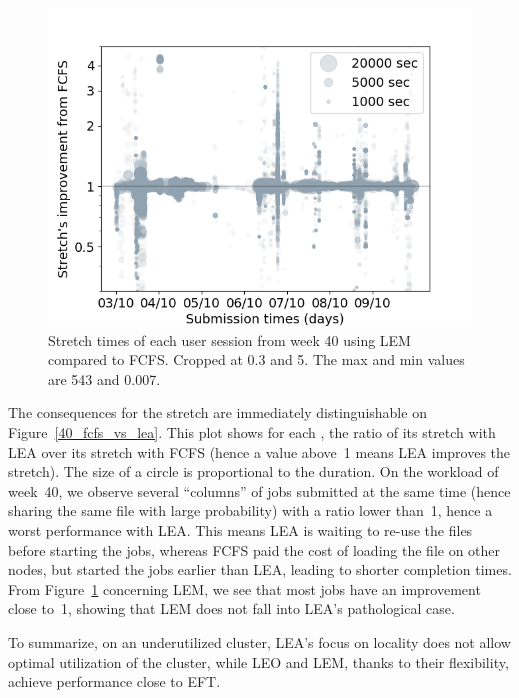 \documentclass[sigconf,review,anonymous]{acmart}
\newcommand{\rev}[1]{{\color{blue}{#1}}}
\newcommand{\us}{\ensuremath{\mathit{user~session}}\xspace}
\begin{document}
\begin{figure}[t]\centering\includegraphics[width=0.9\linewidth]{../MBSS/plot/Stretch_times/Stretch_times_FCFS_LEM_2022-10-03->2022-10-09_V10000_anonymous_450_128_32_256_4_1024.png}\caption{Stretch times of each user session from week 40 using LEM compared to FCFS. Cropped at 0.3 and 5. The max and min values are 543 and 0.007.}\label{40_fcfs_vs_lem}\end{figure}
The consequences for the stretch are immediately distinguishable on Figure~\ref{40_fcfs_vs_lea}.
This plot shows for each \rev{\us}, the ratio of its stretch with LEA over its stretch with FCFS (hence a value above~1 means LEA improves the stretch).
The size of a circle is proportional to the \rev{\us's} duration.
On the workload of week~40, we observe several ``columns'' of jobs submitted at the same time (hence sharing the same file with large probability)
with a ratio lower than~1, hence a worst performance with LEA.
This means LEA is waiting to re-use the files before starting the jobs,
whereas FCFS paid the cost of loading the file on other nodes, but started the jobs
earlier than LEA, leading to shorter completion times.
From Figure~\ref{40_fcfs_vs_lem} concerning LEM, we see that most jobs have an improvement close to~1, showing 
that LEM does not fall into LEA's pathological case.

To summarize, on an underutilized cluster, LEA's focus on locality
does not allow optimal utilization of the cluster, while LEO and LEM, thanks
to their flexibility, achieve performance close to EFT.
\end{document}
